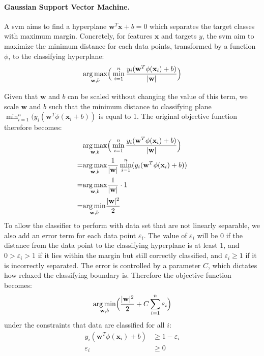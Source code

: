 \paragraph{Gaussian Support Vector Machine.}
A \gls{svm} aims to find a hyperplane $\mathbf{w}^T\mathbf{x}+b=0$ which separates the target classes with maximum margin. Concretely, for features $\mathbf{x}$ and targets $y$, the \gls{svm} aim to maximize the minimum distance for each data points, transformed by a function $\phi$, to the classifying hyperplane:
\begin{equation} \label{dist}
    \underset{\mathbf{w},b}{\operatorname{arg\,max}}\Big(\min_{i=1}^{n}\frac{y_i(\mathbf{w}^T\phi(\mathbf{x}_i)+b)}{|\mathbf{w}|}\Big)
\end{equation}
 
Given that $\mathbf{w}$ and $b$ can be scaled without changing the value of this term, we scale $\mathbf{w}$ and $b$ such that the minimum distance to classifying plane $\min_{i=1}^n(y_i(\mathbf{w}^T\phi(\mathbf{x}_i + b))$ is equal to 1. The original objective function therefore becomes:
\begin{align*}
    &\underset{\mathbf{w},b}{\operatorname{arg\,max}}\Big(\min_{i=1}^{n}\frac{y_i(\mathbf{w}^T\phi(\mathbf{x}_i)+b)}{|\mathbf{w}|}\Big) \\
    =&\underset{\mathbf{w},b}{\operatorname{arg\,max}}\frac{1}{|\mathbf{w}|}\min_{i=1}^{n}(y_i(\mathbf{w}^T\phi(\mathbf{x}_i)+b)) \\
    =&\underset{\mathbf{w},b}{\operatorname{arg\,max}}\frac{1}{|\mathbf{w}|} \cdot 1 \\
    =&\underset{\mathbf{w},b}{\operatorname{arg\,min}}\frac{|\mathbf{w}|^2}{2}
\end{align*}
To allow the classifier to perform with data set that are not linearly separable, we also add an error term for each data point $\varepsilon_i$. The value of $\varepsilon_i$ will be $0$ if the distance from the data point to the classifying hyperplane is at least 1, and $0>\varepsilon_i>1$ if it lies within the margin but still correctly classified, and $\varepsilon_i \geq 1$ if it is incorrectly separated. The error is controlled by a parameter $C$, which dictates how relaxed the classifying boundary is. Therefore the objective function becomes:
\begin{equation*}
    \underset{\mathbf{w},b}{\operatorname{arg\,min}}\Big(\frac{|\mathbf{w}|^2}{2} + C\sum_{i=1}^n \varepsilon_i\Big)
\end{equation*}
under the constraints that data are classified for all $i$:
\begin{align*}
    y_i (\mathbf{w}^T\phi(\mathbf{x}_i) + b) &\geq 1 - \varepsilon_i \\ 
    \varepsilon_i &\geq 0
\end{align*}
